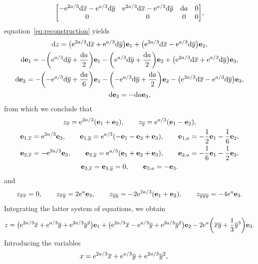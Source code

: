 \documentclass[pdftex]{sigma}%
\numberwithin{equation}{section}
\newcommand{\ox}{\overline{x}}
\newcommand{\oy}{\overline{y}}
\newcommand{\ve}{\mathbf{e}}
\begin{document}
\begin{Example}
\begin{gather}
\begin{bmatrix}
%
-{\rm e}^{2a/3}{\rm d}\ox - {\rm e}^{a/3}{\rm d}\oy & {\rm e}^{2a/3}{\rm d}\ox - {\rm e}^{a/3}{\rm d}\oy & {\rm d}a & 0 \\
%
0 & 0 & 0 &0
\end{bmatrix}\!,
\label{bmu}
\end{gather}
%
equation~\eqref{eq:reconstruction} yields
%
\begin{gather*}
{\rm d}z = \big({\rm e}^{2a/3}{\rm d}\ox + {\rm e}^{a/3}{\rm d}\oy\big)\ve_1
+ \big({\rm e}^{2a/3}{\rm d}\ox - {\rm e}^{a/3}{\rm d}\oy\big)\ve_2,
\\
{\rm d}\ve_1 = -\bigg({\rm e}^{a/3} {\rm d}\oy + \frac{{\rm d}a}{2}\bigg)\ve_1 - \bigg({\rm e}^{a/3}{\rm d}\oy
+ \frac{{\rm d}a}{2}\bigg)\ve_2 + \big({\rm e}^{2a/3}{\rm d}\ox + {\rm e}^{a/3}{\rm d}\oy\big)\ve_3,
\\
{\rm d}\ve_2 = -\bigg({-}{\rm e}^{a/3} {\rm d}\oy + \frac{{\rm d}a}{6}\bigg)\ve_1 - \bigg({-}{\rm e}^{a/3} {\rm d}\oy + \frac{{\rm d}a}{2}\bigg)\ve_2 - \big({\rm e}^{2a/3}{\rm d}\ox - {\rm e}^{a/3}{\rm d}\oy\big)\ve_3, \\
%
{\rm d}\ve_3 = -{\rm d}a \ve_3,
\end{gather*}
%
from which we conclude that
%
\begin{gather*}
z_{\ox} = {\rm e}^{2a/3}(\ve_1 + \ve_2), \qquad
z_{\oy} = {\rm e}^{a/3}(\ve_1 - \ve_2),
\\
\ve_{1,\ox} = {\rm e}^{2a/3}\ve_3,\qquad
\ve_{1,\oy} = {\rm e}^{a/3}(-\ve_1-\ve_2+\ve_3),\qquad
\ve_{1,a} = -\frac{1}{2}\ve_1 - \frac{1}{6}\ve_2,
\\
\ve_{2,\ox} = -{\rm e}^{2a/3}\ve_3,\qquad
\ve_{2,\oy} = {\rm e}^{a/3}(\ve_1+\ve_2+\ve_3),\qquad
\ve_{2,a} = -\frac{1}{6}\ve_1 - \frac{1}{2}\ve_2,
\\
\ve_{3,\ox} =\ve_{3,\oy}=0,\qquad \ve_{3,a}=-\ve_3.
\end{gather*}
%
and
\begin{gather*}
z_{
\ox\ox} = 0,\qquad z_{\ox\oy} = 2e^a\ve_3,\qquad z_{\oy\oy} = -2{\rm e}^{2a/3}(\ve_1+\ve_2),\qquad z_{\oy\oy\oy}= -4e^a\ve_3.
\end{gather*}
Integrating the latter system of equations, we obtain
\begin{gather*}
z = \big({\rm e}^{2a/3}\ox + {\rm e}^{a/3}\oy + {\rm e}^{2a/3}\oy^2\big)\ve_1 + \big({\rm e}^{2a/3}\ox - {\rm e}^{a/3}\oy + {\rm e}^{2a/3}\oy^2\big)\ve_2 - 2e^a \bigg(\ox\oy + \frac{1}{3}\oy^3\bigg)\ve_3.
\end{gather*}
Introducing the variables
\begin{gather*}
x = {\rm e}^{2a/3}\ox + {\rm e}^{a/3}\oy + {\rm e}^{2a/3}\oy^2,\quad\ \

\end{gather*}
\end{Example}
\end{document}
